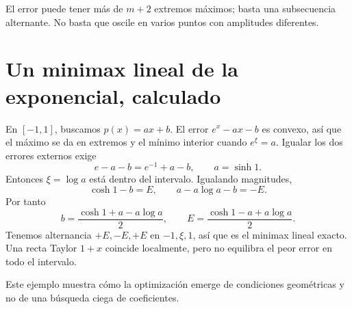 \documentclass[11pt,a4paper]{article}
\theoremstyle{definition}
\begin{document}
El error puede tener más de $m+2$ extremos máximos; basta una subsecuencia alternante. No basta que oscile en varios puntos con amplitudes diferentes.

\section{Un minimax lineal de la exponencial, calculado}
En $[-1,1]$, buscamos $p(x)=ax+b$. El error $e^x-ax-b$ es convexo, así que el máximo se da en extremos y el mínimo interior cuando $e^\xi=a$. Igualar los dos errores externos exige
\[
e-a-b=e^{-1}+a-b,\qquad a=\sinh1.
\]
Entonces $\xi=\log a$ está dentro del intervalo. Igualando magnitudes,
\[
\cosh1-b=E,\qquad a-a\log a-b=-E.
\]
Por tanto
\[
b=\frac{\cosh1+a-a\log a}{2},\qquad
E=\frac{\cosh1-a+a\log a}{2}.
\]
Tenemos alternancia $+E,-E,+E$ en $-1,\xi,1$, así que es el minimax lineal exacto. Una recta Taylor $1+x$ coincide localmente, pero no equilibra el peor error en todo el intervalo.

Este ejemplo muestra cómo la optimización emerge de condiciones geométricas y no de una búsqueda ciega de coeficientes.
\end{document}
